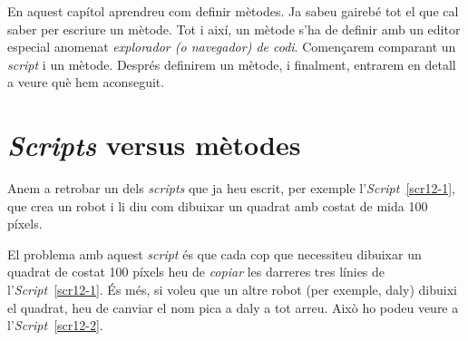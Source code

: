 En aquest capítol aprendreu com definir mètodes. Ja sabeu gairebé tot el que cal saber per escriure un mètode. Tot i així, un mètode s'ha de definir amb un editor especial anomenat \emph{explorador (o navegador) de codi}. Començarem comparant un \emph{script} i un mètode. Després definirem un mètode, i finalment, entrarem en detall a veure què hem aconseguit.

\section{\emph{Scripts} versus mètodes}
Anem a retrobar un dels \emph{scripts} que ja heu escrit, per exemple l'\emph{Script}~\ref{scr12-1}, que crea un robot i li diu com dibuixar un quadrat amb costat de mida 100 píxels.

El problema amb aquest \emph{script} és que cada cop que necessiteu dibuixar un quadrat de costat 100 píxels heu de \emph{copiar} les darreres tres línies de l'\emph{Script}~\ref{scr12-1}. És més, si voleu que un altre robot (per exemple, \textsf{daly}) dibuixi el quadrat, heu de canviar el nom \textsf{pica} a \textsf{daly} a tot arreu. Això ho podeu veure a l'\emph{Script}~\ref{scr12-2}.

